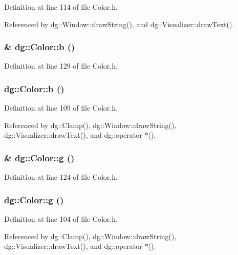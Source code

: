 Definition at line 114 of file Color.h.

Referenced by dg::Window::draw\-String(), and dg::Visualizer::draw\-Text().
\subsubsection{ \& dg::Color::b ()\hspace{0.3cm}{\tt  [inline]}}\label{classdg_1_1Color_a9}




Definition at line 129 of file Color.h.
\subsubsection{ dg::Color::b ()\hspace{0.3cm}{\tt  [inline]}}\label{classdg_1_1Color_a5}




Definition at line 109 of file Color.h.

Referenced by dg::Clamp(), dg::Window::draw\-String(), dg::Visualizer::draw\-Text(), and dg::operator $\ast$().
\subsubsection{ \& dg::Color::g ()\hspace{0.3cm}{\tt  [inline]}}\label{classdg_1_1Color_a8}




Definition at line 124 of file Color.h.
\subsubsection{ dg::Color::g ()\hspace{0.3cm}{\tt  [inline]}}\label{classdg_1_1Color_a4}




Definition at line 104 of file Color.h.

Referenced by dg::Clamp(), dg::Window::draw\-String(), dg::Visualizer::draw\-Text(), and dg::operator $\ast$().
